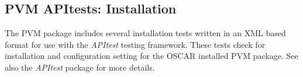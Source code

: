 %
%
%


\subsection{PVM APItests: Installation}
\label{app:pvm-apitests-install}

The PVM package includes several installation tests written in an XML
based format for use with the \emph{APItest} testing framework.  These
tests check for installation and configuration setting for the OSCAR
installed PVM package.  See also the \emph{APItest} package for more 
details.


%
%
%
